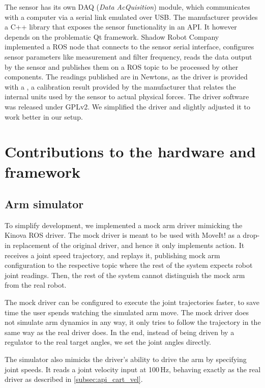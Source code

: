 \documentclass[buriama8_dp.tex]{subfiles}
\begin{document}
The sensor has its own DAQ (\emph{Data AcQuisition}) module, which communicates with a computer via a serial link emulated over USB. The manufacturer provides a C++ library that exposes the sensor functionality in an API. It however depends on the problematic Qt framework. Shadow Robot Company \cite{opto_driver}  implemented a ROS node that connects to the sensor serial interface, configures sensor parameters like measurement and filter frequency, reads the data output by the sensor and publishes them on a ROS topic to be processed by other components. The readings published are in Newtons, as the driver is provided with a , a calibration result provided by the manufacturer that relates the internal units used by the sensor to actual physical forces. The driver software was released under GPLv2. We simplified the driver and slightly adjusted it to work better in our setup.


\section{Contributions to the hardware and framework}
\label{sec:hw_contrib}

\subsection{Arm simulator}
\label{subsec:arm_sim}

To simplify development, we implemented a mock arm driver mimicking the Kinova ROS driver. The mock driver is meant to be used with MoveIt! as a drop-in replacement of the original driver, and hence it only implements  action. It receives a joint speed trajectory, and replays it, publishing mock arm configuration to the respective topic where the rest of the system expects robot joint readings. Then, the rest of the system cannot distinguish the mock arm from the real robot.

The mock driver can be configured to execute the joint trajectories faster, to save time the user spends watching the simulated arm move. The mock driver does not simulate arm dynamics in any way, it only tries to follow the trajectory in the same way as the real driver does. In the end, instead of being driven by a regulator to the real target angles, we set the joint angles directly.

The simulator also mimicks the driver's ability to drive the arm by specifying joint speeds. It reads a joint velocity input at 100\,Hz, behaving exactly as the real driver as described in \ref{subsec:api_cart_vel}.
\end{document}
